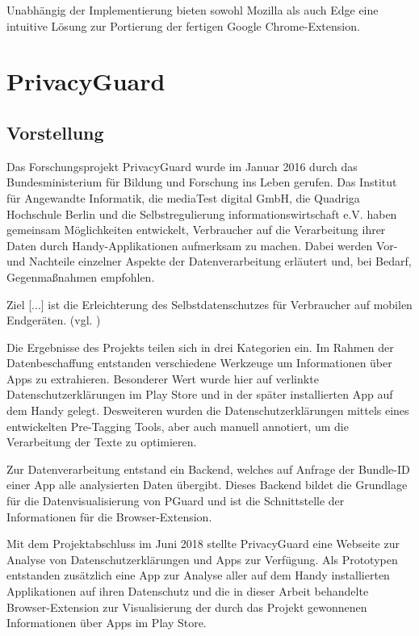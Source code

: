 Unabhängig der Implementierung bieten sowohl Mozilla\cite{mozilla} als auch Edge\cite{edge} eine intuitive Lösung zur Portierung der fertigen Google Chrome-Extension.

\section{PrivacyGuard}
\label{s:pguard}

\subsection{Vorstellung}
\label{ss:vorstellung}
Das Forschungsprojekt PrivacyGuard\cite{pguard} wurde im Januar 2016 durch das Bundesministerium für Bildung und Forschung ins Leben gerufen. Das Institut für Angewandte Informatik\cite{infai}, die mediaTest digital GmbH\cite{mediaTest}, die Quadriga Hochschule Berlin\cite{quadriga} und die Selbstregulierung informationswirtschaft e.V.\cite{sriw} haben gemeinsam Möglichkeiten entwickelt, Verbraucher auf die Verarbeitung ihrer Daten durch Handy-Applikationen aufmerksam zu machen. Dabei werden Vor- und Nachteile einzelner Aspekte der Datenverarbeitung erläutert und, bei Bedarf, Gegenmaßnahmen empfohlen.

\glqq Ziel [...] ist die Erleichterung des Selbstdatenschutzes für Verbraucher auf mobilen Endgeräten.\grqq{} (vgl. \cite{pguard})

Die Ergebnisse des Projekts teilen sich in drei Kategorien ein. Im Rahmen der Datenbeschaffung entstanden verschiedene Werkzeuge um Informationen über Apps zu extrahieren. Besonderer Wert wurde hier auf verlinkte Datenschutzerklärungen im Play Store und in der später installierten App auf dem Handy gelegt. Desweiteren wurden die Datenschutzerklärungen mittels eines entwickelten Pre-Tagging Tools, aber auch manuell annotiert, um die Verarbeitung der Texte zu optimieren.

Zur Datenverarbeitung entstand ein Backend\cite{backend}, welches auf Anfrage der Bundle-ID einer App alle analysierten Daten übergibt. Dieses Backend bildet die Grundlage für die Datenvisualisierung von PGuard und ist die Schnittstelle der Informationen für die Browser-Extension.

Mit dem Projektabschluss im Juni 2018 stellte PrivacyGuard eine Webseite zur Analyse von Datenschutzerklärungen und Apps zur Verfügung\cite{tools}. Als Prototypen entstanden zusätzlich eine App zur Analyse aller auf dem Handy installierten Applikationen auf ihren Datenschutz und die in dieser Arbeit behandelte Browser-Extension zur Visualisierung der durch das Projekt gewonnenen Informationen über Apps im Play Store.

